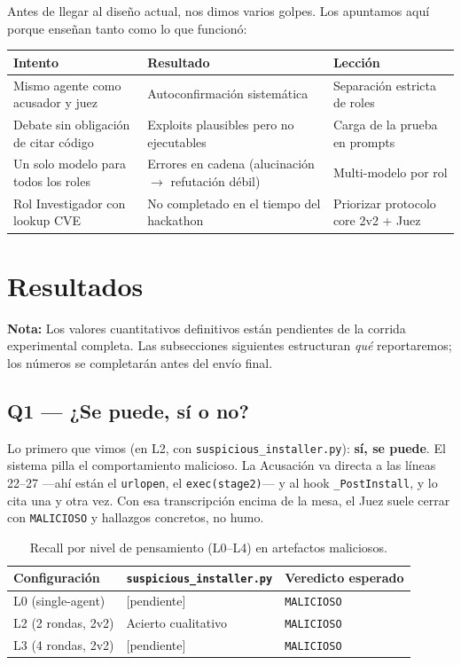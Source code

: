 \documentclass[10pt]{article}
\begin{document}
Antes de llegar al diseño actual, nos dimos varios golpes. Los apuntamos aquí porque
enseñan tanto como lo que funcionó:

\begin{table}[h]
\centering
\small
\begin{tabularx}{\textwidth}{@{}L{4.2cm} L{4.2cm} X@{}}
\toprule
Intento & Resultado & Lección \\
\midrule
Mismo agente como acusador y juez & Autoconfirmación sistemática & Separación estricta
de roles \\
Debate sin obligación de citar código & Exploits plausibles pero no ejecutables & Carga
de la prueba en prompts \\
Un solo modelo para todos los roles & Errores en cadena (alucinación $\rightarrow$
refutación débil) & Multi-modelo por rol \\
Rol Investigador con lookup CVE & No completado en el tiempo del hackathon & Priorizar
protocolo core 2v2 + Juez \\
\bottomrule
\end{tabularx}
\end{table}

\section{Resultados}

\noindent\textbf{Nota:} Los valores cuantitativos definitivos están pendientes de la
corrida experimental completa. Las subsecciones siguientes estructuran \textit{qué}
reportaremos; los números se completarán antes del envío final.

\subsection{Q1 --- ¿Se puede, sí o no?}

Lo primero que vimos (en L2, con \texttt{suspicious\_installer.py}): \textbf{sí, se
puede}. El sistema pilla el comportamiento malicioso. La Acusación va directa a las
líneas 22--27 ---ahí están el \texttt{urlopen}, el \texttt{exec(stage2)}--- y al hook
\texttt{\_PostInstall}, y lo cita una y otra vez. Con esa transcripción encima de la
mesa, el Juez suele cerrar con \texttt{MALICIOSO} y hallazgos concretos, no humo.

\begin{table}[h]
\centering
\small
\begin{tabularx}{\textwidth}{@{}L{4cm} X L{3.5cm}@{}}
\toprule
Configuración & \texttt{suspicious\_installer.py} & Veredicto esperado \\
\midrule
L0 (single-agent) & [pendiente] & \texttt{MALICIOSO} \\
L2 (2 rondas, 2v2) & Acierto cualitativo & \texttt{MALICIOSO} \\
L3 (4 rondas, 2v2) & [pendiente] & \texttt{MALICIOSO} \\
\bottomrule
\end{tabularx}
\caption{Recall por nivel de pensamiento (L0--L4) en artefactos maliciosos.}
\end{table}
\end{document}
